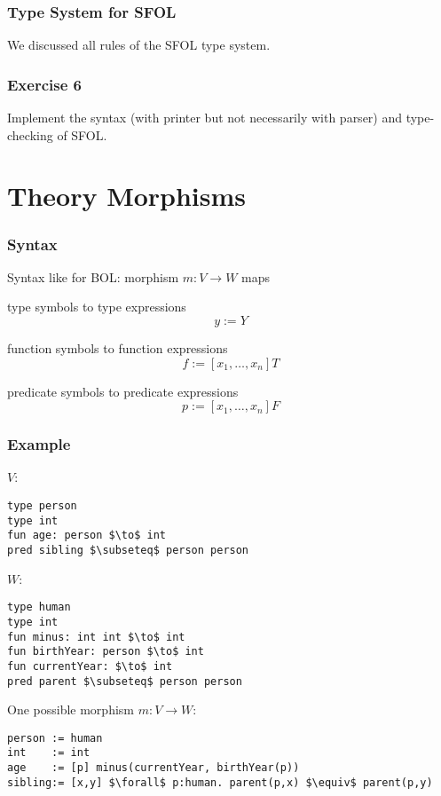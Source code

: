 \begin{frame}\frametitle{Type System for SFOL}
We discussed all rules of the SFOL type system.
\end{frame}

\begin{frame}\frametitle{Exercise 6}
Implement the syntax (with printer but not necessarily with parser) and type-checking of SFOL.
\end{frame}

\section{Theory Morphisms}

\begin{frame}\frametitle{Syntax}
\begin{blockitems}{Syntax like for BOL: morphism $m:V\to W$ maps}
\item type symbols to type expressions
 \[y:=Y\]
\item function symbols to function expressions
 \[f:=[x_1,\ldots,x_n]T\]
\item predicate symbols to predicate expressions
 \[p:=[x_1,\ldots,x_n]F\]
\end{blockitems}
\end{frame}

\begin{frame}[fragile]\frametitle{Example}
$V$:
\begin{lstlisting}[basicstyle={\footnotesize\color{gray}}]
type person
type int
fun age: person $\to$ int
pred sibling $\subseteq$ person person
\end{lstlisting}

$W$:
\begin{lstlisting}[basicstyle={\footnotesize\color{gray}}]
type human
type int
fun minus: int int $\to$ int
fun birthYear: person $\to$ int
fun currentYear: $\to$ int
pred parent $\subseteq$ person person
\end{lstlisting}

One possible morphism $m:V\to W$:
\begin{lstlisting}[basicstyle={\footnotesize\color{gray}}]
person := human
int    := int
age    := [p] minus(currentYear, birthYear(p))
sibling:= [x,y] $\forall$ p:human. parent(p,x) $\equiv$ parent(p,y)
\end{lstlisting}
\end{frame}

